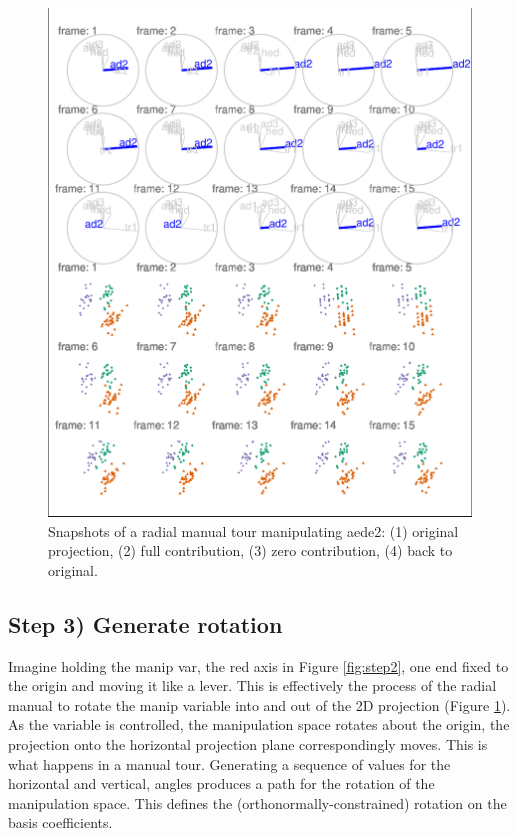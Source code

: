 \begin{Schunk}
\begin{figure}

{\centering \includegraphics[width=1\linewidth]{spinifex_paper_files/figure-latex/step3-1} 

}

\caption[Snapshots of a radial manual tour manipulating aede2]{Snapshots of a radial manual tour manipulating aede2: (1) original projection, (2) full contribution, (3) zero contribution, (4) back to original. }\label{fig:step3}
\end{figure}
\end{Schunk}

\hypertarget{step-3-generate-rotation}{%
\subsection{Step 3) Generate rotation}\label{step-3-generate-rotation}}

Imagine holding the manip var, the red axis in Figure \ref{fig:step2},
one end fixed to the origin and moving it like a lever. This is
effectively the process of the radial manual to rotate the manip
variable into and out of the 2D projection (Figure \ref{fig:step3}). As
the variable is controlled, the manipulation space rotates about the
origin, the projection onto the horizontal projection plane
correspondingly moves. This is what happens in a manual tour. Generating
a sequence of values for the horizontal and vertical, angles produces a
path for the rotation of the manipulation space. This defines the
(orthonormally-constrained) rotation on the basis coefficients.

